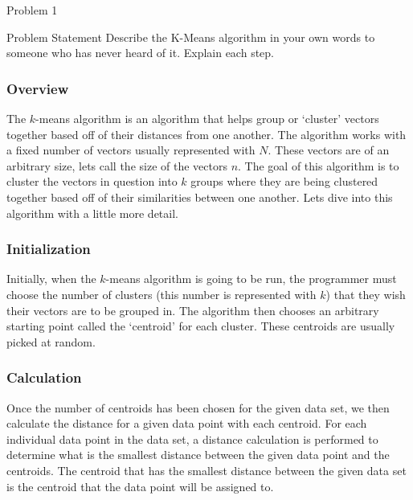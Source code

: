\begin{problem}{Problem 1}
    \begin{statement}{Problem Statement}
        Describe the K-Means algorithm in your own words to someone who has never heard of it. Explain each step.
    \end{statement}

    \begin{highlight}[Solution]
        \subsubsection*{Overview}

        The $k$-means algorithm is an algorithm that helps group or `cluster' vectors together based off of their distances from one another. The algorithm works with a fixed number of vectors usually 
        represented with $N$. These vectors are of an arbitrary size, lets call the size of the vectors $n$. The goal of this algorithm is to cluster the vectors in question into $k$ groups where they
        are being clustered together based off of their similarities between one another. Lets dive into this algorithm with a little more detail. \vspace*{1em}

        \subsubsection*{Initialization}

        Initially, when the $k$-means algorithm is going to be run, the programmer must choose the number of clusters (this number is represented with $k$) that they wish their vectors are to be grouped
        in. The algorithm then chooses an arbitrary starting point called the `centroid' for each cluster. These centroids are usually picked at random. \vspace*{1em}

        \subsubsection*{Calculation}

        Once the number of centroids has been chosen for the given data set, we then calculate the distance for a given data point with each centroid. For each individual data point in the data set, a distance
        calculation is performed to determine what is the smallest distance between the given data point and the centroids. The centroid that has the smallest distance between the given data set is the centroid
        that the data point will be assigned to. \vspace*{1em}


\end{highlight}
\end{problem}
